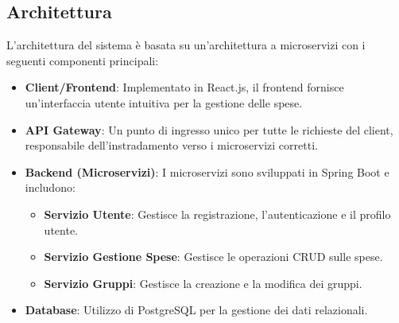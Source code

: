 \subsection{Architettura}
L'architettura del sistema è basata su un'architettura a microservizi con i seguenti componenti principali:
\begin{itemize}
    \item \textbf{Client/Frontend}: Implementato in React.js, il frontend fornisce un'interfaccia utente intuitiva per la gestione delle spese.
    \item \textbf{API Gateway}: Un punto di ingresso unico per tutte le richieste del client, responsabile dell'instradamento verso i microservizi corretti.
    \item \textbf{Backend (Microservizi)}: I microservizi sono sviluppati in Spring Boot e includono:
    \begin{itemize}
        \item \textbf{Servizio Utente}: Gestisce la registrazione, l'autenticazione e il profilo utente.
        \item \textbf{Servizio Gestione Spese}: Gestisce le operazioni CRUD sulle spese.
        \item \textbf{Servizio Gruppi}: Gestisce la creazione e la modifica dei gruppi.
    \end{itemize}
    \item \textbf{Database}: Utilizzo di PostgreSQL per la gestione dei dati relazionali.
\end{itemize}
